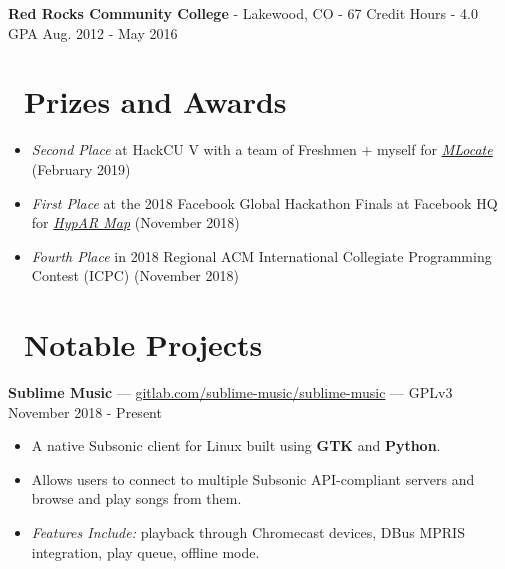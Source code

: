 \documentclass[10pt,letterpaper]{article}
\begin{document}
\vspace{2pt}
\textbf{Red Rocks Community College} - Lakewood, CO - 67 Credit Hours - 4.0 GPA
\hfill Aug. 2012 - May 2016

\section*{\faTrophy\ Prizes and Awards}
\begin{itemize}
    \item \textit{Second Place} at HackCU V with a team of Freshmen + myself
        for
        \href{https://sumnerevans.com/pages/portfolio.html#MLocate}{\textit{MLocate}}
        (February 2019)
    \item \textit{First Place} at the 2018 Facebook Global Hackathon Finals at
        Facebook HQ for
        \href{https://sumnerevans.com/pages/portfolio.html#HypAR-Map}{\textit{HypAR Map}}
        (November 2018)
    \item \textit{Fourth Place} in 2018 Regional ACM International Collegiate
        Programming Contest (ICPC) (November 2018)
\end{itemize}

\section*{\faCode\ Notable Projects}
\textbf{Sublime Music} ---
\href{https://gitlab.com/sublime-music/sublime-music}{gitlab.com/sublime-music/sublime-music}
--- GPLv3 \hfill November 2018 - Present
\begin{itemize}
    \item A native Subsonic client for Linux built using \textbf{GTK} and
        \textbf{Python}.
    \item Allows users to connect to multiple Subsonic API-compliant servers and
        browse and play songs from them.
    \item \textit{Features Include:} playback through Chromecast devices, DBus
        MPRIS integration, play queue, offline mode.
\end{itemize}
\end{document}
